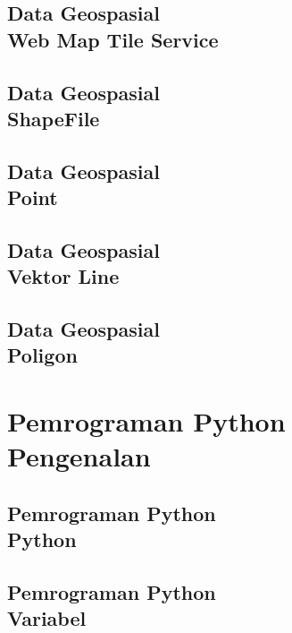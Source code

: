 \documentclass{WileySix}
\begin{document}
\chapter[Web Map Tile Service]
{Data Geospasial\\ Web Map Tile Service}




\chapter[Shapefile]
{Data Geospasial\\ ShapeFile}


\chapter[Shapefile Point]
{Data Geospasial\\ Point}


\chapter[Data Vektor Line]
{Data Geospasial\\ Vektor Line}


\chapter[Shapefile Poligon]
{Data Geospasial\\ Poligon}



\part[Pemrograman Python]
{Pemrograman Python\\ Pengenalan}

\chapter[Python]
{Pemrograman Python\\ Python}


\chapter[Variabel]
{Pemrograman Python\\ Variabel}

\end{document}
